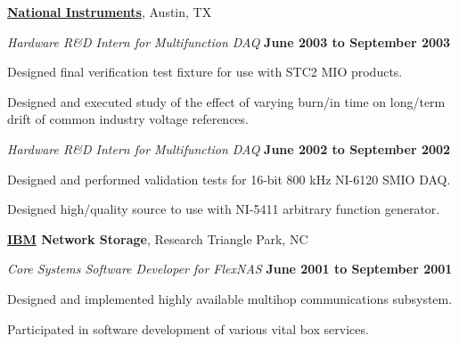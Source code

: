 \documentclass[10pt]{article}           %
\newcommand{\entry}{\item[{}]}
\newcommand{\halfblankline}{\quad\vspace{-0.5\baselineskip}\pagebreak[3]}
\begin{document}
\href{http://www.ni.com/}{\textbf{National Instruments}},
Austin, TX
\begin{cvlist}[loose]

    \entry \textit{Hardware R\&D Intern for Multifunction DAQ}%
            \hfill \textbf{June 2003 to September 2003}
    \begin{cvlist}
        \item Designed final verification test fixture for use with STC2 MIO
                products.
        \item Designed and executed study of the effect of varying burn\-/in time
                on long\-/term drift of common industry voltage references.
    \end{cvlist}

    \entry \textit{Hardware R\&D Intern for Multifunction DAQ}%
            \hfill \textbf{June 2002 to September 2002}
    \begin{cvlist}
        \item Designed and performed validation tests for 16-bit 800 kHz
                NI-6120 SMIO DAQ.

        \item Designed high\-/quality source to use with NI-5411 arbitrary
                function generator.
    \end{cvlist}

\end{cvlist}

\halfblankline

\textbf{\href{http://www.ibm.com/}{IBM} Network Storage},
Research Triangle Park, NC
\begin{cvlist}[loose]

    \entry \textit{Core Systems Software Developer for FlexNAS}%
            \hfill \textbf{June 2001 to September 2001}
    \begin{cvlist}
        \item Designed and implemented highly available multihop communications
                subsystem.
        \item Participated in software development of various vital box
                services.
    \end{cvlist}

\end{cvlist}

\halfblankline
\end{document}
